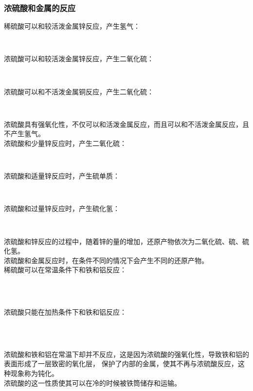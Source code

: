 \documentclass[UTF8]{ctexart}
\begin{document}
\subsubsection{浓硫酸和金属的反应}
    稀硫酸可以和较活泼金属锌反应，产生氢气：
    \begin{center}
        \\[4mm]
    \end{center}
    浓硫酸可以和较活泼金属锌反应，产生二氧化硫：
    \begin{center}
        \\[4mm]
    \end{center}
    浓硫酸可以和不活泼金属铜反应，产生二氧化硫：
    \begin{center}
        \\[4mm]
    \end{center}
    浓硫酸具有强氧化性，不仅可以和活泼金属反应，而且可以和不活泼金属反应，且不产生氢气。\\[8mm]
    浓硫酸和少量锌反应时，产生二氧化硫：
    \begin{center}
        \\[4mm]
    \end{center}
    浓硫酸和适量锌反应时，产生硫单质：
    \begin{center}
        \\[4mm]
    \end{center}
    浓硫酸和过量锌反应时，产生硫化氢：
    \begin{center}
        \\[4mm]
    \end{center}
    浓硫酸和锌反应的过程中，随着锌的量的增加，还原产物依次为二氧化硫、硫、硫化氢。\\[3mm]
    浓硫酸和金属反应时，在条件不同的情况下会产生不同的还原产物。\\[8mm]
    稀硫酸可以在常温条件下和铁和铝反应：
    \begin{center}
        \\[2mm]
        \\[4mm]
    \end{center}
    浓硫酸只能在加热条件下和铁和铝反应：
    \begin{center}
        \\[2mm]
        \\[4mm]
    \end{center}
    浓硫酸和铁和铝在常温下却并不反应，这是因为浓硫酸的强氧化性，导致铁和铝的表面形成了一层致密的氧化层，
    保护了内部的金属，使其不再与浓硫酸反应，这种现象称为钝化。\\[3mm]
    浓硫酸的这一性质使其可以在冷的时候被铁筒储存和运输。
\end{document}
